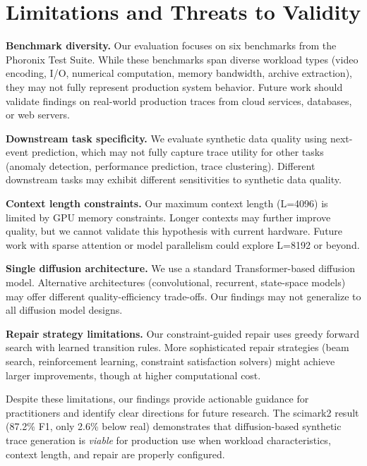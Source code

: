 \section{Limitations and Threats to Validity}\label{sec:limitations-and-threats-to-validity}

\textbf{Benchmark diversity.} Our evaluation focuses on six benchmarks from the Phoronix Test Suite. While these benchmarks span diverse workload types (video encoding, I/O, numerical computation, memory bandwidth, archive extraction), they may not fully represent production system behavior. Future work should validate findings on real-world production traces from cloud services, databases, or web servers.

\textbf{Downstream task specificity.} We evaluate synthetic data quality using next-event prediction, which may not fully capture trace utility for other tasks (anomaly detection, performance prediction, trace clustering). Different downstream tasks may exhibit different sensitivities to synthetic data quality.

\textbf{Context length constraints.} Our maximum context length (L=4096) is limited by GPU memory constraints. Longer contexts may further improve quality, but we cannot validate this hypothesis with current hardware. Future work with sparse attention or model parallelism could explore L=8192 or beyond.

\textbf{Single diffusion architecture.} We use a standard Transformer-based diffusion model. Alternative architectures (convolutional, recurrent, state-space models) may offer different quality-efficiency trade-offs. Our findings may not generalize to all diffusion model designs.

\textbf{Repair strategy limitations.} Our constraint-guided repair uses greedy forward search with learned transition rules. More sophisticated repair strategies (beam search, reinforcement learning, constraint satisfaction solvers) might achieve larger improvements, though at higher computational cost.

Despite these limitations, our findings provide actionable guidance for practitioners and identify clear directions for future research. The scimark2 result (87.2\% F1, only 2.6\% below real) demonstrates that diffusion-based synthetic trace generation is \textit{viable} for production use when workload characteristics, context length, and repair are properly configured.